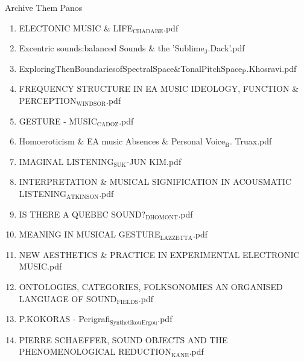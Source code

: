 \documentclass[11pt]{article}
\begin{document}
\item Archive Them Panos
\label{sec-1-1-1-1-49-1-3}
\begin{enumerate}
\item ELECTONIC MUSIC \& LIFE$_{\text{CHADABE}}$.pdf
\label{sec-1-1-1-1-49-1-3-1}

\item Excentric sounds:balanced Sounds \& the 'Sublime$_{\text{J}}$.Dack'.pdf
\label{sec-1-1-1-1-49-1-3-2}

\item ExploringThenBoundariesofSpectralSpace\&TonalPitchSpace$_{\text{P}}$.Khosravi.pdf
\label{sec-1-1-1-1-49-1-3-3}

\item FREQUENCY STRUCTURE IN EA MUSIC IDEOLOGY, FUNCTION \& PERCEPTION$_{\text{WINDSOR}}$.pdf
\label{sec-1-1-1-1-49-1-3-4}

\item GESTURE - MUSIC$_{\text{CADOZ}}$.pdf
\label{sec-1-1-1-1-49-1-3-5}

\item Homoeroticism \& EA music Absences \& Personal Voice$_{\text{B}}$. Truax.pdf
\label{sec-1-1-1-1-49-1-3-6}

\item IMAGINAL LISTENING$_{\text{SUK}}$-JUN KIM.pdf
\label{sec-1-1-1-1-49-1-3-7}

\item INTERPRETATION \& MUSICAL SIGNIFICATION IN ACOUSMATIC LISTENING$_{\text{ATKINSON}}$.pdf
\label{sec-1-1-1-1-49-1-3-8}

\item IS THERE A QUEBEC SOUND?$_{\text{DHOMONT}}$.pdf
\label{sec-1-1-1-1-49-1-3-9}

\item MEANING IN MUSICAL GESTURE$_{\text{LAZZETTA}}$.pdf
\label{sec-1-1-1-1-49-1-3-10}

\item NEW AESTHETICS \& PRACTICE IN EXPERIMENTAL ELECTRONIC MUSIC.pdf
\label{sec-1-1-1-1-49-1-3-11}

\item ONTOLOGIES, CATEGORIES, FOLKSONOMIES AN ORGANISED LANGUAGE OF SOUND$_{\text{FIELDS}}$.pdf
\label{sec-1-1-1-1-49-1-3-12}

\item P.KOKORAS - Perigrafi$_{\text{Synthetikou}}$$_{\text{Ergou}}$.pdf
\label{sec-1-1-1-1-49-1-3-13}

\item PIERRE SCHAEFFER, SOUND OBJECTS AND THE PHENOMENOLOGICAL REDUCTION$_{\text{KANE}}$.pdf
\label{sec-1-1-1-1-49-1-3-14}


\end{enumerate}
\end{document}
